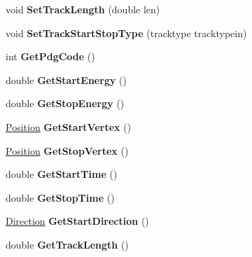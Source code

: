 \begin{DoxyCompactItemize}
\item 
\hypertarget{classParticle_a09fe260918298982e88d085bc02e367b}{
void {\bfseries SetTrackLength} (double len)}
\label{classParticle_a09fe260918298982e88d085bc02e367b}

\item 
\hypertarget{classParticle_a9ab8ff63c2cdd3c634ef03d9a96d05a0}{
void {\bfseries SetTrackStartStopType} (tracktype tracktypein)}
\label{classParticle_a9ab8ff63c2cdd3c634ef03d9a96d05a0}

\item 
\hypertarget{classParticle_ac4aef1157eca6d3e79adabca530b3b30}{
int {\bfseries GetPdgCode} ()}
\label{classParticle_ac4aef1157eca6d3e79adabca530b3b30}

\item 
\hypertarget{classParticle_aa8a441034e0e6671e5e9067b2feb2532}{
double {\bfseries GetStartEnergy} ()}
\label{classParticle_aa8a441034e0e6671e5e9067b2feb2532}

\item 
\hypertarget{classParticle_aedd7d21b6a8008a093499d604c72c8b2}{
double {\bfseries GetStopEnergy} ()}
\label{classParticle_aedd7d21b6a8008a093499d604c72c8b2}

\item 
\hypertarget{classParticle_a80f0b4c9a5dbca8cb91d6d0337b612bf}{
\hyperlink{classPosition}{Position} {\bfseries GetStartVertex} ()}
\label{classParticle_a80f0b4c9a5dbca8cb91d6d0337b612bf}

\item 
\hypertarget{classParticle_aab18d092e2da1eccb353b8bffb8da8f6}{
\hyperlink{classPosition}{Position} {\bfseries GetStopVertex} ()}
\label{classParticle_aab18d092e2da1eccb353b8bffb8da8f6}

\item 
\hypertarget{classParticle_a1d2d7774c0a9bee3442afaec795e1af1}{
double {\bfseries GetStartTime} ()}
\label{classParticle_a1d2d7774c0a9bee3442afaec795e1af1}

\item 
\hypertarget{classParticle_a11103eaa90fb8e663bde050e91d4211c}{
double {\bfseries GetStopTime} ()}
\label{classParticle_a11103eaa90fb8e663bde050e91d4211c}

\item 
\hypertarget{classParticle_a5c78bc2a89dc82fb79b4a4a812261a0c}{
\hyperlink{classDirection}{Direction} {\bfseries GetStartDirection} ()}
\label{classParticle_a5c78bc2a89dc82fb79b4a4a812261a0c}

\item 
\hypertarget{classParticle_acd3ba836f0d8d2ad816265aae6a045cc}{
double {\bfseries GetTrackLength} ()}
\label{classParticle_acd3ba836f0d8d2ad816265aae6a045cc}


\end{DoxyCompactItemize}

